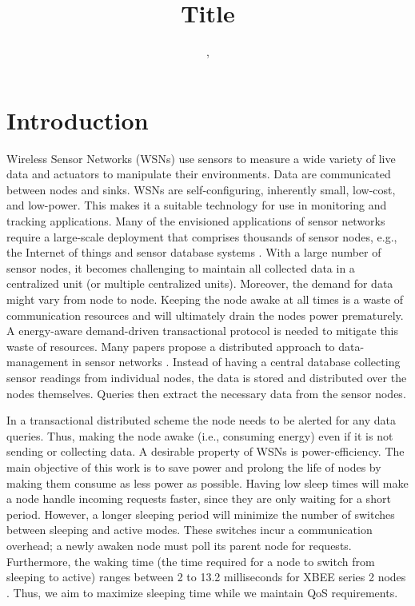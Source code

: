 \documentclass[10pt, conference]{IEEEtran}
\title{Title}
\author{\authorblockN{Faisal Nawab\authorrefmark{1}, Kai\authorrefmark{1}}
, 
\authorblockA{\authorrefmark{1} Dept. of Computer Science, University of California at Santa Barbara, Santa Barbara, CA, {nawab}@cs.ucsb.edu}
}
\begin{document}
\maketitle

\begin{abstract}

\end{abstract}

\begin{keywords}

\end{keywords}

\section{Introduction}\label{sec:Intro}

Wireless Sensor Networks (WSNs) use sensors to measure a wide variety of live data and actuators to manipulate their environments. Data are communicated between nodes and sinks. WSNs are self-configuring, inherently small, low-cost, and low-power. This makes it a suitable technology for use in monitoring and tracking applications. Many of the envisioned applications of sensor networks require a large-scale deployment that comprises thousands of sensor nodes, e.g., the Internet of things \cite{22} and sensor database systems \cite{2}. With a large number of sensor nodes, it becomes challenging to maintain all collected data in a centralized unit (or multiple centralized units). Moreover, the demand for data might vary from node to node. Keeping the node awake at all times is a waste of communication resources and will ultimately drain the nodes power prematurely. A energy-aware demand-driven transactional protocol is needed to mitigate this waste of resources. Many papers propose a distributed approach to data-management in sensor networks \cite{2,4.11,23}. Instead of having a central database collecting sensor readings from individual nodes, the data is stored and distributed over the nodes themselves. Queries then extract the necessary data from the sensor nodes. 

In a transactional distributed scheme the node needs to be alerted for any data queries. Thus, making the node awake (i.e., consuming energy) even if it is not sending or collecting data. A desirable property of WSNs is power-efficiency. The main objective of this work is to save power and prolong the life of nodes by making them consume as less power as possible. Having low sleep times will make a node handle incoming requests faster, since they are only waiting for a short period. However, a longer sleeping period will minimize the number of switches between sleeping and active modes. These switches incur a communication overhead; a newly awaken node must poll its parent node for requests. Furthermore, the waking time (the time required for a node to switch from sleeping to active) ranges between 2 to 13.2 milliseconds for XBEE series 2 nodes \cite{19}. Thus, we aim to maximize sleeping time while we maintain QoS requirements.
\end{document}
